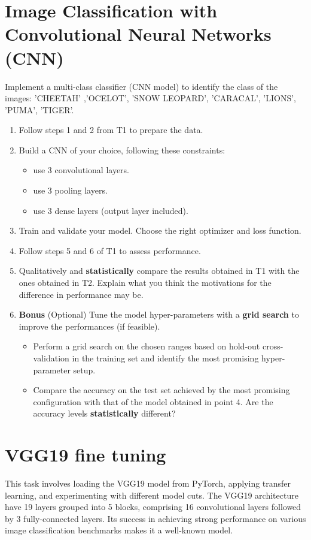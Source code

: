 \documentclass[11pt]{scrartcl}
\begin{document}
\section{Image Classification with Convolutional Neural Networks (CNN)}

Implement a multi-class classifier (CNN model) to identify the class of the images: 'CHEETAH' ,'OCELOT', 'SNOW LEOPARD', 'CARACAL', 'LIONS', 'PUMA', 'TIGER'.

\begin{enumerate}
\item Follow steps 1 and 2 from T1 to prepare the data.
\item Build a CNN of your choice, following these constraints: 
\begin{itemize}
\item use 3 convolutional layers.
\item use 3 pooling layers.
\item use 3 dense layers (output layer included).
\end{itemize}
\item Train and validate your model. Choose the right optimizer and loss function. 
\item Follow steps 5 and 6 of T1 to assess performance.
\item Qualitatively and \textbf{statistically} compare the results obtained in T1 with the ones obtained in T2. Explain what you think the motivations for the difference in performance may be.
\item \textbf{Bonus} (Optional) Tune the model hyper-parameters with a \textbf{grid search} to improve the performances (if feasible).
\begin{itemize}
\item Perform a grid search on the chosen ranges based on hold-out cross-validation in the training set and identify the most promising hyper-parameter setup.
\item Compare the accuracy on the test set achieved by the most promising configuration with that of the model obtained in point 4. Are the accuracy levels \textbf{statistically} different?
\end{itemize}
\end{enumerate}

\newpage
\section{VGG19 fine tuning}

This task involves loading the VGG19 model from PyTorch, applying transfer learning, and experimenting with different model cuts. The VGG19 architecture have 19 layers grouped into 5 blocks, comprising 16 convolutional layers followed by 3 fully-connected layers. Its success in achieving strong performance on various image classification benchmarks makes it a well-known model.
\end{document}
